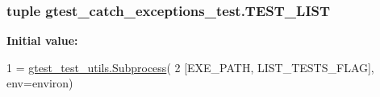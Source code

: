 \hypertarget{namespacegtest__catch__exceptions__test_a47d343e41ab21971800091c7166f6129}{
\subsubsection[{T\-E\-S\-T\-\_\-\-L\-I\-S\-T}]{\setlength{\rightskip}{0pt plus 5cm}tuple gtest\-\_\-catch\-\_\-exceptions\-\_\-test.\-T\-E\-S\-T\-\_\-\-L\-I\-S\-T}}\label{namespacegtest__catch__exceptions__test_a47d343e41ab21971800091c7166f6129}
{\bfseries Initial value\-:}
\begin{DoxyCode}
1 = \hyperlink{classgtest__test__utils_1_1_subprocess}{gtest\_test\_utils.Subprocess}(
2     [EXE\_PATH, LIST\_TESTS\_FLAG], env=environ)
\end{DoxyCode}

